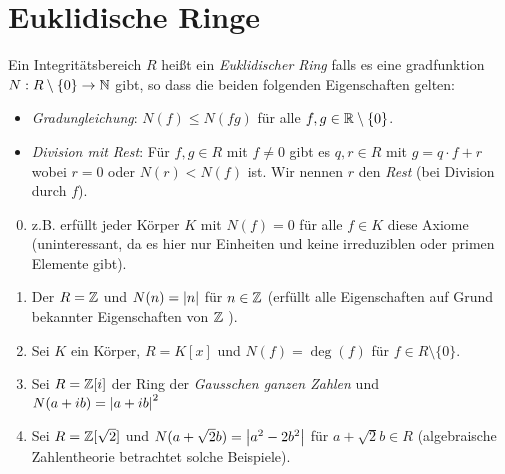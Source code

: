 \section{Euklidische Ringe}
\begin{definition}
	Ein Integritätsbereich $R$ heißt ein \emph{Euklidischer Ring} falls es eine gradfunktion $N: R \setminus \{0\}  \to \mathbb{N}$ gibt,
	so dass die beiden folgenden Eigenschaften gelten:
	\begin{itemize}
		\item \emph{Gradungleichung}: $N(f) \leq N(fg)$ für alle $f,g \in \mathbb{R} \setminus \{0\} $.
		\item \emph{Division mit Rest}: Für $f,g \in R$ mit $f \neq  0$ gibt es $q,r \in R$ mit $g = q\cdot f + r$ wobei $r = 0$ oder $N(r) < N(f)$ ist.
			Wir nennen $r$ den \emph{Rest} (bei Division durch $f $).
	\end{itemize}
\end{definition}

\begin{eg}
	\begin{enumerate}[1)]
		\setcounter{enumi}{-1}
		\item z.B. erfüllt jeder Körper $K$ mit $N(f) = 0$ für alle $f \in K$ diese Axiome
			(uninteressant, da es hier nur Einheiten und keine irreduziblen oder primen Elemente gibt).
		\item Der $R = \mathbb{Z}$ und $N(n) = \abs{n}$ für $n \in \mathbb{Z}$ (erfüllt alle Eigenschaften auf Grund bekannter Eigenschaften von $\mathbb{Z}$ ).
		\item Sei  $K$ ein Körper, $R=K[x]$ und $N(f) = \deg(f)$ für $f \in R \setminus \{0\} $.
		\item Sei $R = \mathbb{Z}[i]$ der Ring der \emph{Gausschen ganzen Zahlen} und $N(a+ib) = \abs{a+ib}^2$
		\item Sei $R = \mathbb{Z}[\sqrt{2}]$ und $N(a + \sqrt{2} b) = \abs{a^2 - 2 b^2}$ für $a + \sqrt{2} b \in R$ (algebraische Zahlentheorie betrachtet solche Beispiele).
	\end{enumerate}
\end{eg}

